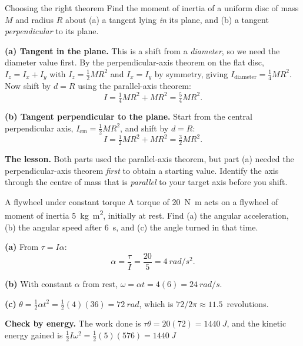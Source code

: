 \begin{exbox}{Choosing the right theorem}
Find the moment of inertia of a uniform disc of mass $M$ and radius $R$ about (a) a tangent lying
\emph{in} its plane, and (b) a tangent \emph{perpendicular} to its plane.

 \textbf{(a) Tangent in the plane.} This is a shift from a \emph{diameter}, so we need the
diameter value first. By the perpendicular-axis theorem on the flat disc,
$I_z=I_x+I_y$ with $I_z=\tfrac{1}{2}MR^{2}$ and $I_x=I_y$ by symmetry, giving
$I_{\text{diameter}}=\tfrac{1}{4}MR^{2}$. Now shift by $d=R$ using the parallel-axis theorem:
\[
I=\tfrac{1}{4}MR^{2}+MR^{2}=\tfrac{5}{4}MR^{2}.
\]

 \textbf{(b) Tangent perpendicular to the plane.} Start from the central perpendicular axis,
$I_{\text{cm}}=\tfrac{1}{2}MR^{2}$, and shift by $d=R$:
\[
I=\tfrac{1}{2}MR^{2}+MR^{2}=\tfrac{3}{2}MR^{2}.
\]

 \textbf{The lesson.} Both parts used the parallel-axis theorem, but part (a) needed the
perpendicular-axis theorem \emph{first} to obtain a starting value. Identify the axis through the centre
of mass that is \emph{parallel} to your target axis before you shift.
\end{exbox}

\begin{exbox}{A flywheel under constant torque}
A torque of \SI{20}{N.m} acts on a flywheel of moment of inertia \SI{5}{kg.m^2}, initially at rest.
Find (a) the angular acceleration, (b) the angular speed after \SI{6}{s}, and (c) the angle turned in
that time.

 \textbf{(a)} From $\tau=I\alpha$:
\[
\alpha=\frac{\tau}{I}=\frac{20}{5}=\SI{4}{rad/s^2}.
\]

 \textbf{(b)} With constant $\alpha$ from rest,
$\omega=\alpha t=4(6)=\SI{24}{rad/s}$.

 \textbf{(c)} $\theta=\tfrac{1}{2}\alpha t^{2}=\tfrac{1}{2}(4)(36)=\SI{72}{rad}$, which is
$72/2\pi\approx11.5$~revolutions.

 \textbf{Check by energy.} The work done is $\tau\theta=20(72)=\SI{1440}{J}$, and the kinetic
energy gained is $\tfrac{1}{2}I\omega^{2}=\tfrac{1}{2}(5)(576)=\SI{1440}{J}$ \checkmark
{}
\end{exbox}

